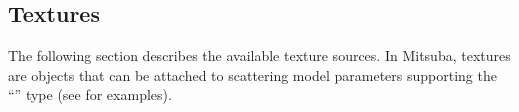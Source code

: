 \newpage
\subsection{Textures}
\label{sec:textures}
The following section describes the available texture sources. In Mitsuba,
textures are objects that can be attached to scattering model
parameters supporting the  ``\Texture'' type (see  for examples).

